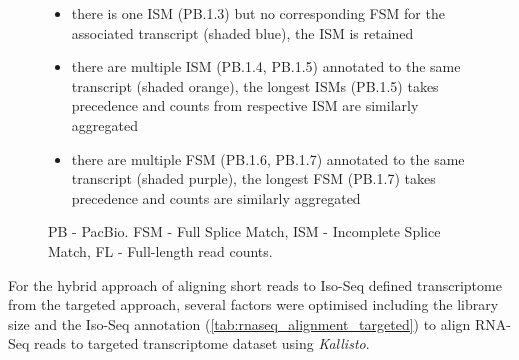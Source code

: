 \begin{figure}[htp]
{\begin{itemize}
			\item there is one ISM (PB.1.3) but no corresponding FSM for the associated transcript (shaded blue), the ISM is retained
			\item there are multiple ISM (PB.1.4, PB.1.5) annotated to the same transcript (shaded orange), the longest ISMs (PB.1.5) takes precedence and counts from respective ISM are similarly aggregated 
			\item there are multiple FSM (PB.1.6, PB.1.7) annotated to the same transcript (shaded purple), the longest FSM (PB.1.7) takes precedence and counts are similarly aggregated
			\\
		\end{itemize} 
		PB - PacBio. FSM - Full Splice Match, ISM - Incomplete Splice Match, FL - Full-length read counts.  
	}
	\label{fig:ism_collapse}
\end{figure}

\clearpage
{}
For the hybrid approach of aligning short reads to Iso-Seq defined transcriptome from the targeted approach, several factors were optimised including the library size and the Iso-Seq annotation (\cref{tab:rnaseq_alignment_targeted}) to align RNA-Seq reads to targeted transcriptome dataset using \textit{Kallisto}. 

